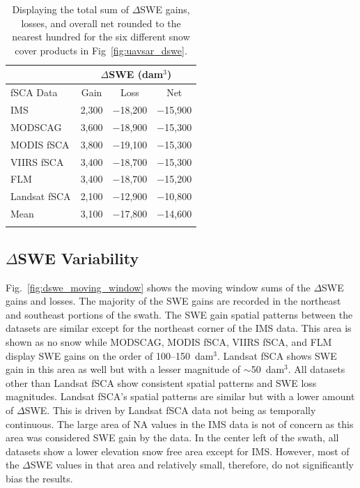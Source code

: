 \begin{table}
\centering
\caption{Displaying the total sum of $\Delta$SWE gains, losses, and overall net rounded to the nearest hundred for the six different snow cover products in Fig~\ref{fig:uavsar_dswe}.}
\begin{tabular}{lccc}
\toprule
& \multicolumn{3}{c}{$\Delta$SWE (dam$^{3}$)} \\
\midrule
fSCA Data & Gain & Loss & Net \\
\midrule
IMS & 2,300 & $-$18,200 & $-$15,900 \\
MODSCAG & 3,600 & $-$18,900 & $-$15,300 \\
MODIS fSCA & 3,800 & $-$19,100 & $-$15,300 \\
VIIRS fSCA & 3,400 & $-$18,700 & $-$15,300 \\
FLM & 3,400 & $-$18,700 & $-$15,200 \\
Landsat fSCA & 2,100 & $-$12,900 & $-$10,800 \\
\midrule
Mean & 3,100 & $-$17,800 & $-$14,600 \\
\bottomrule
\label{tab:dswe_stats}
\end{tabular}
\end{table}



\hypertarget{ch4-results}{\subsection{$\Delta$SWE Variability}\label{ch4-results}}

Fig.~\ref{fig:dswe_moving_window} shows the moving window sums of the $\Delta$SWE gains and losses. The majority of the SWE gains are recorded in the northeast and southeast portions of the swath. The SWE gain spatial patterns between the datasets are similar except for the northeast corner of the IMS data. This area is shown as no snow while MODSCAG, MODIS fSCA, VIIRS fSCA, and FLM display SWE gains on the order of 100--150~dam$^{3}$. Landsat fSCA shows SWE gain in this area as well but with a lesser magnitude of $\sim$50~dam$^{3}$. All datasets other than Landsat fSCA show consistent spatial patterns and SWE loss magnitudes. Landsat fSCA's spatial patterns are similar but with a lower amount of $\Delta$SWE. This is driven by Landsat fSCA data not being as temporally continuous. The large area of NA values in the IMS data is not of concern as this area was considered SWE gain by the data. In the center left of the swath, all datasets show a lower elevation snow free area except for IMS. However, most of the $\Delta$SWE values in that area and relatively small, therefore, do not significantly bias the results.

